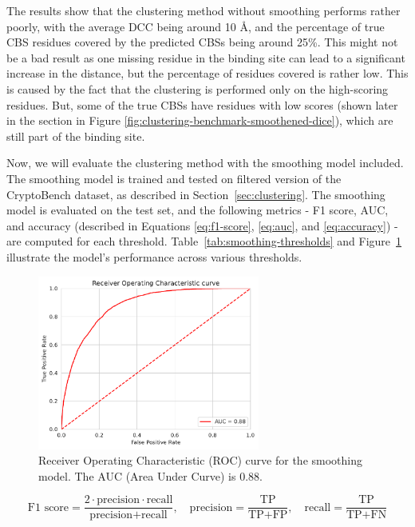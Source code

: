 The results show that the clustering method without smoothing performs rather poorly, with the average DCC being around 10 \AA, and the percentage of true CBS residues covered by the predicted CBSs being around 25\%. This might not be a bad result as one missing residue in the binding site can lead to a significant increase in the distance, but the percentage of residues covered is rather low. This is caused by the fact that the clustering is performed only on the high-scoring residues. But, some of the true CBSs have residues with low scores (shown later in the section in Figure \ref{fig:clustering-benchmark-smoothened-dice}), which are still part of the binding site.

Now, we will evaluate the clustering method with the smoothing model included. The smoothing model is trained and tested on filtered version of the CryptoBench dataset, as described in Section~\ref{sec:clustering}. The smoothing model is evaluated on the test set, and the following metrics - F1 score, AUC, and accuracy (described in Equations \ref{eq:f1-score}, \ref{eq:auc}, and \ref{eq:accuracy}) - are computed for each threshold. Table~\ref{tab:smoothing-thresholds} and Figure~\ref{fig:smoothing-roc} illustrate the model's performance across various thresholds.

\begin{figure}[htpb]
    \centering
    \includegraphics[width=0.65\textwidth]{img/smoothing-roc.pdf}
    \caption{Receiver Operating Characteristic (ROC) curve for the smoothing model. The AUC (Area Under Curve) is 0.88.}
    \label{fig:smoothing-roc}
\end{figure}

\begin{equation}
\text{F1 score} = \frac{2 \cdot \text{precision} \cdot \text{recall}}{\text{precision} + \text{recall}}, \quad
\text{precision} = \frac{\text{TP}}{\text{TP} + \text{FP}}, \quad
\text{recall} = \frac{\text{TP}}{\text{TP} + \text{FN}}
\label{eq:f1-score}
\end{equation}

